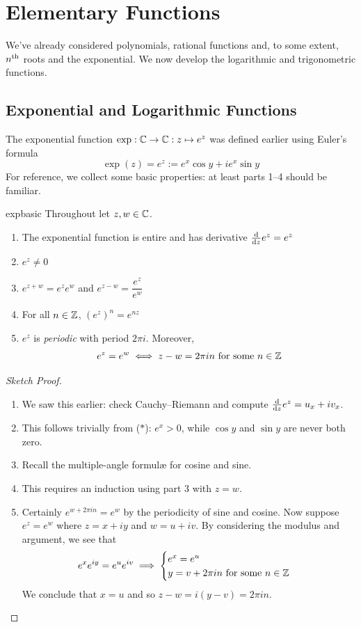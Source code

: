 \graphicspath{{3functions/asy/}}
\thispagestyle{empty}


\section{Elementary Functions}

We've already considered polynomials, rational functions and, to some extent, $n\textsuperscript{th}$ roots and the exponential. We now develop the logarithmic and trigonometric functions.

\subsection[Exponential and Logarithmic Functions]{Exponential and Logarithmic Functions}%

The exponential function $\exp:\mathbb{C}\to\mathbb{C}:z\mapsto e^z$ was defined earlier using Euler's formula
\[\exp(z)=e^z:=e^x\cos y+ie^x\sin y \tag{$\ast$}\]
For reference, we collect some basic properties: at least parts 1--4 should be familiar.

\begin{lemm}{}{expbasic}
Throughout let $z,w\in\mathbb{C}$.
\begin{enumerate}\itemsep1pt
  \item The exponential function is entire and has derivative $\frac{\mathrm{d} }{\mathrm{d} z}e^z=e^z$
  \item $e^z\neq 0$
  \item $e^{z+w}=e^{z}e^{w}$ and $e^{z-w}=\dfrac{e^{z}}{e^{w}}$
  \item For all $n\in\mathbb{Z}$, $(e^z)^n=e^{nz}$
  \item\label{lemmpart:exp5} $e^z$ is \emph{periodic} with period $2\pi i$. Moreover,
  \[e^z=e^w\iff z-w=2\pi in\text{ for some }n\in\mathbb{Z}\]
\end{enumerate}
\end{lemm}

\begin{proof}[Sketch Proof]
\begin{enumerate}\itemsep1pt
  \item We saw this earlier: check Cauchy--Riemann and compute $\frac{\mathrm{d} }{\mathrm{d} z}e^z=u_x+iv_x$.
  \item This follows trivially from ($\ast$): $e^x>0$, while $\cos y$ and $\sin y$ are never both zero.
  \item Recall the multiple-angle formulæ for cosine and sine.
  \item This requires an induction using part 3 with $z=w$.
	\item Certainly $e^{w+2\pi in}=e^w$ by the periodicity of sine and cosine. Now suppose $e^z=e^w$ where $z=x+iy$ and $w=u+iv$. By considering the modulus and argument, we see that
	\[e^xe^{iy}=e^ue^{iv}\implies \begin{cases}
	e^x=e^u\\
	y=v+2\pi in\text{ for some }n\in\mathbb{Z}
	\end{cases}\]
	We conclude that $x=u$ and so $z-w=i(y-v)=2\pi in$.\qedhere
\end{enumerate}
\end{proof}

